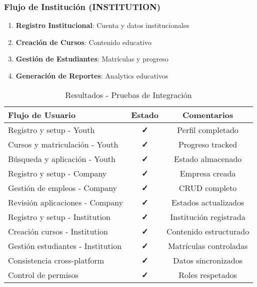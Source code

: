 \documentclass[12pt,a4paper]{article}
\begin{document}
\subsubsection{Flujo de Institución (INSTITUTION)}

\begin{enumerate}
    \item \textbf{Registro Institucional}: Cuenta y datos institucionales
    \item \textbf{Creación de Cursos}: Contenido educativo
    \item \textbf{Gestión de Estudiantes}: Matrículas y progreso
    \item \textbf{Generación de Reportes}: Analytics educativos
\end{enumerate}

\begin{table}[H]
\centering
\caption{Resultados - Pruebas de Integración}
\begin{tabular}{@{}p{6cm}cc@{}}
\toprule
\textbf{Flujo de Usuario} & \textbf{Estado} & \textbf{Comentarios} \\
\midrule
Registro y setup - Youth & \textcolor{successgreen}{\textbf{✓}} & Perfil completado \\
Cursos y matriculación - Youth & \textcolor{successgreen}{\textbf{✓}} & Progreso tracked \\
Búsqueda y aplicación - Youth & \textcolor{successgreen}{\textbf{✓}} & Estado almacenado \\
Registro y setup - Company & \textcolor{successgreen}{\textbf{✓}} & Empresa creada \\
Gestión de empleos - Company & \textcolor{successgreen}{\textbf{✓}} & CRUD completo \\
Revisión aplicaciones - Company & \textcolor{successgreen}{\textbf{✓}} & Estados actualizados \\
Registro y setup - Institution & \textcolor{successgreen}{\textbf{✓}} & Institución registrada \\
Creación cursos - Institution & \textcolor{successgreen}{\textbf{✓}} & Contenido estructurado \\
Gestión estudiantes - Institution & \textcolor{successgreen}{\textbf{✓}} & Matrículas controladas \\
Consistencia cross-platform & \textcolor{successgreen}{\textbf{✓}} & Datos sincronizados \\
Control de permisos & \textcolor{successgreen}{\textbf{✓}} & Roles respetados \\
\bottomrule
\end{tabular}
\end{table}
\end{document}
